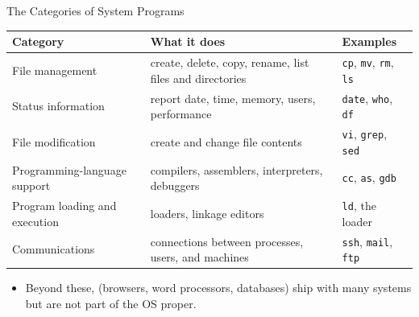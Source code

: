 \documentclass[aspectratio=169]{beamer}
\begin{document}
\begin{frame}{The Categories of System Programs}
  \centering
  \footnotesize
  \renewcommand{\arraystretch}{1.25}
  \begin{tabular}{p{}p{}p{}}
    \textbf{Category} & \textbf{What it does} & \textbf{Examples} \\
    \hline
    File management & create, delete, copy, rename, list files and directories
      & \texttt{cp}, \texttt{mv}, \texttt{rm}, \texttt{ls} \\
    Status information & report date, time, memory, users, performance
      & \texttt{date}, \texttt{who}, \texttt{df} \\
    File modification & create and change file contents
      & \texttt{vi}, \texttt{grep}, \texttt{sed} \\
    Programming-language support & compilers, assemblers, interpreters,
      debuggers & \texttt{cc}, \texttt{as}, \texttt{gdb} \\
    Program loading and execution & loaders, linkage editors
      & \texttt{ld}, the loader \\
    Communications & connections between processes, users, and machines
      & \texttt{ssh}, \texttt{mail}, \texttt{ftp} \\
  \end{tabular}
  \vspace{0.2cm}
  \begin{itemize}
    \item Beyond these,  (browsers, word processors,
      databases) ship with many systems but are not part of the OS proper.
  \end{itemize}
\end{frame}
\end{document}
